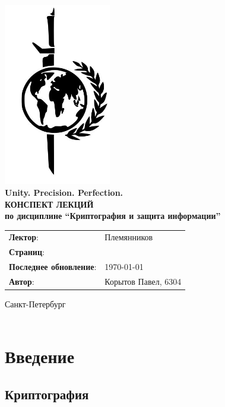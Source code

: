 \documentclass[a4paper, 14pt]{extarticle}
\begin{document}
\begin{titlepage}
    {\centering
        {\bfseries
            \includegraphics[height=8cm]{../res/logo.jpeg}\\
            Unity. Precision. Perfection.\\
            \vspace{3.5cm}
            \uppercase{Конспект лекций} \\
            по дисциплине \enquote{Криптография и защита информации}\\
        }
        \vspace{\fill}
    }
    \begin{tabular}{l l}
        \textbf{Лектор}: & Племянников\\
        \textbf{Страниц}: &\pageref{LastPage}\\
        \textbf{Последнее обновление}: & \today{}\\ 
        \textbf{Автор}: & Корытов Павел, 6304\\
    \end{tabular}

    \vspace{2cm}
    {\centering
        Санкт-Петербург \\
        \the\year\\
    }
\end{titlepage}

\tableofcontents
\newpage

\section{Введение}
\subsection{Криптография}
\end{document}
